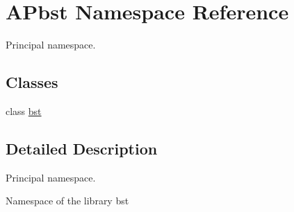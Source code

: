 \hypertarget{namespace_a_pbst}{}\section{A\+Pbst Namespace Reference}
\label{namespace_a_pbst}


Principal namespace.  


\subsection*{Classes}
\begin{DoxyCompactItemize}
\item 
class \hyperlink{class_a_pbst_1_1bst}{bst}
\end{DoxyCompactItemize}


\subsection{Detailed Description}
Principal namespace. 

Namespace of the library bst 
